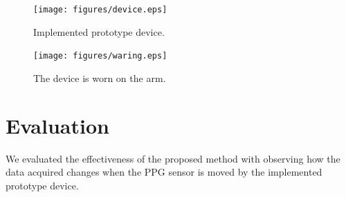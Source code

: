 \documentclass[sigconf]{acmart}
\begin{document}
\begin{figure}[!t]
  \centering
  \texttt{[image: figures/device.eps]}
  \caption{Implemented prototype device.}
  \label{fig:device}
\end{figure}

\begin{figure}[!t]
  \centering
  \texttt{[image: figures/waring.eps]}
  \caption{The device is worn on the arm.}
  \label{fig:waring}
\end{figure}



\section{Evaluation}
\label{sec:evaluation}
We evaluated the effectiveness of the proposed method with observing how the data acquired changes when the PPG sensor is moved by the implemented prototype device.

\end{document}
